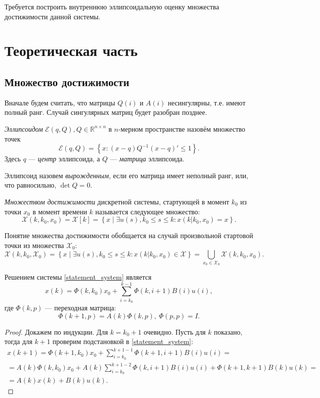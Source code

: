 \documentclass[10pt, a4paper]{article}
\renewcommand{\ell}{\mathcal{E}}
\begin{document}
Требуется построить внутреннюю эллипсоидальную оценку множества достижимости данной системы.

\section{Теоретическая часть}
\subsection{Множество достижимости}
Вначале будем считать, что матрицы $Q(i)$ и $A(i)$ несингулярны, т.е. имеют полный ранг. Случай сингулярных матриц будет разобран позднее.
\begin{df}
\textit{Эллипсоидом} $\ell(q,Q), Q\in\mathbb{R}^{n\times n}$ в $n$-мерном пространстве назовём множество точек
\[ \ell(q,Q) = \left\{ x\colon (x-q)Q^{-1}(x-q)' \leqslant 1 \right\}. \]
Здесь $q$ --- \textit{центр} эллипсоида, а $Q$ --- \textit{матрица} эллипсоида. 
\end{df}
Эллипсоид назовем \textit{вырожденным}, если его матрица имеет неполный ранг, или, что равносильно, $\det Q = 0$.
\begin{df}
\textit{Множеством достижимости} дискретной системы, стартующей в момент $k_0$ из точки $x_0$ в момент времени $k$ называется следующее множество:
\[ \mathcal{X}(k,k_0,x_0) = \mathcal{X}[k] = \left\{ x \middle| \exists u(s), k_0\leqslant s\leqslant k\colon x(k|k_0,x_0)=x \right\}.\]
\end{df}
Понятие множества достижимости обобщается на случай произвольной стартовой точки из множества $\mathcal{X}_0$:
\[ \mathcal{X}(k,k_0,\mathcal{X}_0) = \left\{ x \middle| \exists u(s), k_0\leqslant s\leqslant k\colon x(k|k_0,x_0)\in \mathcal{X} \right\} = \bigcup\limits_{x_0\in\mathcal{X}_0}\mathcal{X}(k,k_0,x_0).\]
\begin{theorem}
Решением системы \eqref{statement_system} является 
\begin{equation}\label{solution}
	x(k) = \Phi(k,k_0)x_0 + \sum\limits_{i=k_0}^{k-1}\Phi(k,i+1)B(i)u(i),
\end{equation} 
где $\Phi(k,p)$ --- переходная матрица:
\begin{equation}\label{solution}
	\Phi(k+1,p) = A(k)\Phi(k,p),\ \Phi(p,p)=I.
\end{equation}
\end{theorem}
\begin{proof}
	Докажем по индукции. Для $k=k_0+1$ очевидно. Пусть для $k$ показано, тогда для $k+1$
	проверим подстановкой в \eqref{statement_system}:
	\begin{gather*}
		{x}(k+1) = \Phi(k+1,k_0)x_0 + \sum\limits_{i=k_0}^{k+1-1}\Phi(k+1,i+1)B(i)u(i) = 
		\\ = A(k)\Phi(k,k_0)x_0 + A(k)\sum\limits_{i=k_0}^{k+1-2}\Phi(k,i+1)B(i)u(i) + 
		\Phi(k+1,k+1)B(k)u(k) = \\ = A(k)x(k) + B(k)u(k).
	\end{gather*}
\end{proof}
\end{document}
